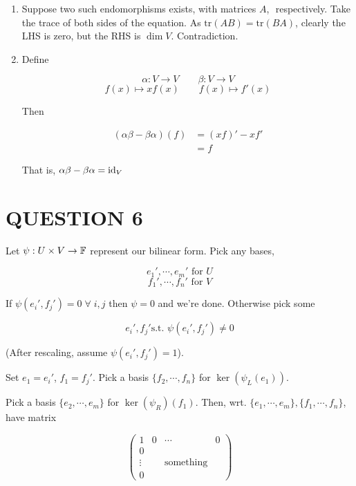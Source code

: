 \documentclass[a4paper]{article}
\begin{document}
\begin{enumerate} [label = (\alph*)]
	\item Suppose two such endomorphisms exists, with matrices $ A $, $  $ respectively. Take the trace of both sides of the equation. As $ \text{tr}(AB) = \text{tr}(BA)  $, clearly the LHS is zero, but the RHS is $ \dim V $. Contradiction. 
	
	\item Define
	
	\[ \alpha : V \to V \qquad \beta : V \to V \]
	\[ f(x) \mapsto xf(x) \qquad f(x) \mapsto f'(x) \]
	
	Then
	
	\begin{align*}
	(\alpha\beta - \beta \alpha)(f) & = (xf)'  - xf'  \\
	& = f
	\end{align*}
	
	That is, $ \alpha \beta- \beta \alpha = \operatorname{id}_{V} $
	
\end{enumerate}





\section{QUESTION 6}

Let $ \psi: U \times V \to \mathbb{F} $ represent our bilinear form. Pick any bases, 

\[ e_{1}', \cdots, e_{m}'  \text{ for }  U  \]
\[ f_{1}',\cdots,f_{n}'  \text{ for }  V  \]


If $ \psi(e_{i}',f_{j}') = 0 \; \forall \; i,j $ then $ \psi = 0 $ and we're done. Otherwise pick some 

\[ e_{i}',f_{j}' \text {s.t. } \psi(e_{i}',f_{j}') \neq 0 \]

(After rescaling, assume $ \psi(e_{i}',f_{j}') = 1 $).

Set $ e_{1} = e_{i}' $, $ f_{1} = f_{j}' $. Pick a basis $ \{ f_{2},\cdots,f_{n} \} $ for $ \ker(\psi_{L}(e_{1})) $.

Pick a basis $ \{ e_{2},\cdots,e_{m} \} $ for $ \ker(\psi_{R})(f_{1}) $. Then, wrt. $ \{ e_{1},\cdots,e_{m}\}, \{  f_{1},\cdots,f_{n} \} $, have matrix 

\[ \begin{pmatrix}
1 & 0 & \cdots & 0\\
0 & & & \\
\vdots & & \text{something}& \\
0 & & &
\end{pmatrix} \]
\end{document}
